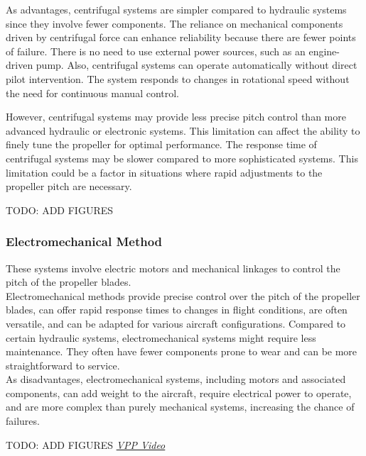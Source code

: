 As advantages, centrifugal systems are simpler compared to hydraulic systems since they involve fewer components.
The reliance on mechanical components driven by centrifugal force can enhance reliability because there are fewer points of failure.
There is no need to use external power sources, such as an engine-driven pump.
Also, centrifugal systems can operate automatically without direct pilot intervention.
The system responds to changes in rotational speed without the need for continuous manual control.

However, centrifugal systems may provide less precise pitch control than more advanced hydraulic or electronic systems. This limitation can affect the ability to finely tune the propeller for optimal performance.
The response time of centrifugal systems may be slower compared to more sophisticated systems. This limitation could be a factor in situations where rapid adjustments to the propeller pitch are necessary.\cite{VPP2}

TODO: ADD FIGURES

\subsubsection{Electromechanical Method}
These systems involve electric motors and mechanical linkages to control the pitch of the propeller blades.\\

Electromechanical methods provide precise control over the pitch of the propeller blades, can offer rapid response times to changes in flight conditions, are often versatile, and can be adapted for various aircraft configurations.
Compared to certain hydraulic systems, electromechanical systems might require less maintenance.
They often have fewer components prone to wear and can be more straightforward to service.\\

As disadvantages, electromechanical systems, including motors and associated components, can add weight to the aircraft, require electrical power to operate, and are more complex than purely mechanical systems, increasing the chance of failures.\cite{VPP2}

TODO: ADD FIGURES
\href{https://www.youtube.com/watch?v=MpsBOQOUB-4}{\textit{VPP Video}}
